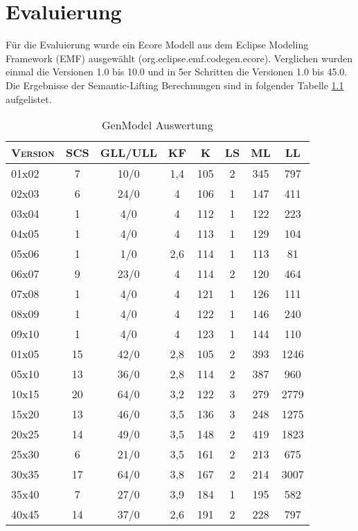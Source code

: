 \chapter{Evaluierung}
\label{evaluierung}

Für die Evaluierung wurde ein Ecore Modell aus dem Eclipse Modeling Framework (EMF) ausgewählt
(org.eclipse.emf.codegen.ecore). Verglichen wurden einmal die Versionen 1.0 bis 10.0 und in
5er Schritten die Versionen 1.0 bis 45.0. Die Ergebnisse der Semantic-Lifting Berechnungen sind in
folgender Tabelle \ref{eval} aufgelistet.

\begin{table}[h!]
\centering
\caption{GenModel Auswertung}
\begin{tabular}{lccccccc}
\hline
\textsc{Version} & SCS & GLL/ULL & KF & K & LS & ML & LL\\
\hline
\hline
01x02 & 7 & 10/0 & 1,4 & 105 & 2 & 345 & 797\\
02x03 & 6 & 24/0 & 4 & 106 & 1 & 147 & 411\\
03x04 & 1 & 4/0 & 4 & 112 & 1 & 122 & 223\\
04x05 & 1 & 4/0 & 4 & 113 & 1 & 129 & 104\\
05x06 & 1 & 1/0 & 2,6 & 114 & 1 & 113 & 81\\
06x07 & 9 & 23/0 & 4 & 114 & 2 & 120 & 464\\
07x08 & 1 & 4/0 & 4 & 121 & 1 & 126 & 111\\
08x09 & 1 & 4/0 & 4 & 122 & 1 & 146 & 240\\
09x10 & 1 & 4/0 & 4 & 123 & 1 & 144 & 110\\
\hline
01x05 & 15 & 42/0 & 2,8 & 105 & 2 & 393 & 1246\\
05x10 & 13 & 36/0 & 2,8 & 114 & 2 & 387 & 960\\
10x15 & 20 & 64/0 & 3,2 & 122 & 3 & 279 & 2779\\
15x20 & 13 & 46/0 & 3,5 & 136 & 3 & 248 & 1275\\
20x25 & 14 & 49/0 & 3,5 & 148 & 2 & 419 & 1823\\
25x30 & 6 & 21/0 & 3,5 & 161 & 2 & 213 & 675\\
30x35 & 17 & 64/0 & 3,8 & 167 & 2 & 214 & 3007\\
35x40 & 7 & 27/0 & 3,9 & 184 & 1 & 195 & 582\\
40x45 & 14 & 37/0 & 2,6 & 191 & 2 & 228 & 797\\
\hline
\end{tabular}
\label{eval}
\end{table}

